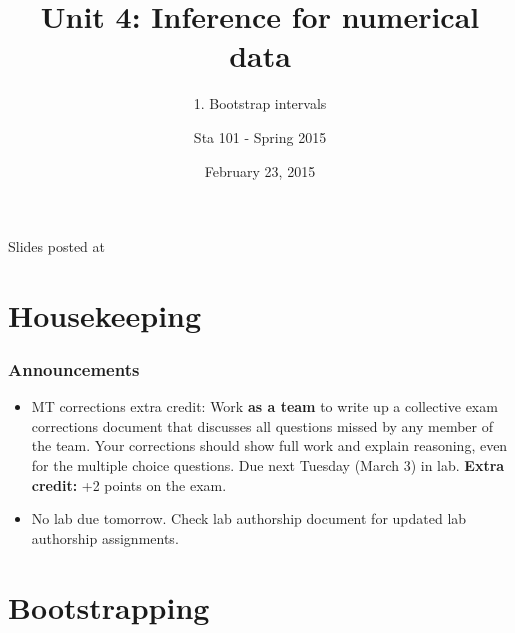 \documentclass[11pt,containsverbatim,handout,xcolor=xelatex,dvipsnames,table]{beamer}
\title{Unit 4: Inference for numerical data}
\subtitle{1. Bootstrap intervals}
\author{Sta 101 - Spring 2015}
\date{February 23, 2015}
\institute{Duke University, Department of Statistical Science}
\begin{document}


\begin{frame}[plain]

\titlepage
\vfill
{\scriptsize {} \hfill Slides posted at  \webLink{\CourseSite}{\CourseSite}}
\addtocounter{framenumber}{-1} 

\end{frame}


\section{Housekeeping}


\begin{frame}
\frametitle{Announcements}

\begin{itemize}

\item MT corrections extra credit: Work \textbf{as a team} to write up a collective exam corrections document that discusses all questions missed by any member of the team. Your corrections should show full work and explain reasoning, even for the multiple choice questions. Due next Tuesday (March 3) in lab. \textbf{Extra credit:} +2 points on the exam.

\item No lab due tomorrow. Check lab authorship document for updated lab authorship assignments.

\end{itemize}

\end{frame}


\section{Bootstrapping}

\end{document}
